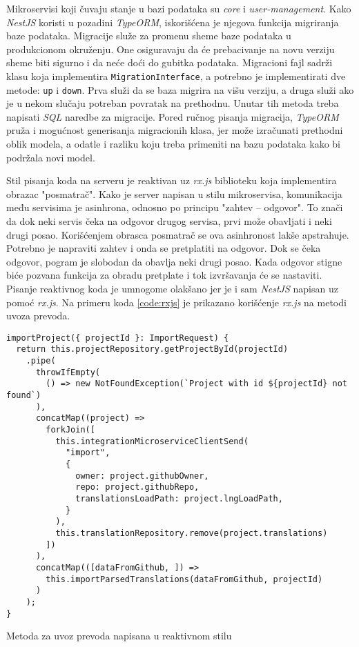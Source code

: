 Mikroservisi koji čuvaju stanje u bazi podataka su \textit{core} i 
\textit{user-management}. Kako \textit{NestJS} koristi u pozadini \textit{TypeORM}, 
iskorišćena je njegova funkcija migriranja baze podataka. Migracije služe 
za promenu sheme baze podataka u produkcionom okruženju. One osiguravaju da 
će prebacivanje na novu verziju sheme biti sigurno i da neće doći do gubitka 
podataka. Migracioni fajl sadrži klasu koja implementira 
\texttt{MigrationInterface}, a potrebno je implementirati dve metode: 
\texttt{up} i \texttt{down}. Prva služi da se baza migrira na višu 
verziju, a druga služi ako je u nekom slučaju potreban povratak na prethodnu. 
Unutar tih metoda treba napisati \textit{SQL} naredbe za migracije. Pored 
ručnog pisanja migracija, \textit{TypeORM} pruža i mogućnost generisanja 
migracionih klasa, jer može izračunati prethodni oblik modela, a odatle i 
razliku koju treba primeniti na bazu podataka kako bi podržala novi model. 

Stil pisanja koda na serveru je reaktivan uz \textit{rx.js} biblioteku koja
implementira obrazac "posmatrač". Kako je server napisan u stilu mikroservisa,
komunikacija među servisima je asinhrona, odnosno po principu 
"zahtev -- odgovor". To znači da dok neki servis čeka na odgovor drugog 
servisa, prvi može obavljati i neki drugi posao. Korišćenjem obrasca 
posmatrač se ova asinhronost lakše apstrahuje. Potrebno je napraviti zahtev 
i onda se pretplatiti na odgovor. Dok se čeka odgovor, pogram je slobodan da 
obavlja neki drugi posao. Kada odgovor stigne biće pozvana funkcija 
za obradu pretplate i tok izvršavanja će se nastaviti.
Pisanje reaktivnog koda je umnogome olakšano jer je i sam \textit{NestJS} 
napisan uz pomoć \textit{rx.js}. Na primeru koda \ref{code:rxjs} je prikazano
korišćenje \textit{rx.js} na metodi uvoza prevoda.


\begin{listing}[h]
  \centering
  \begin{verbatim}
importProject({ projectId }: ImportRequest) {
  return this.projectRepository.getProjectById(projectId)
    .pipe(
      throwIfEmpty(
        () => new NotFoundException(`Project with id ${projectId} not found`)
      ),
      concatMap((project) =>
        forkJoin([
          this.integrationMicroserviceClientSend(
            "import",
            {
              owner: project.githubOwner,
              repo: project.githubRepo,
              translationsLoadPath: project.lngLoadPath,
            }
          ),
          this.translationRepository.remove(project.translations)
        ])
      ),
      concatMap(([dataFromGithub, ]) =>
        this.importParsedTranslations(dataFromGithub, projectId)
      )
    );
}  
  \end{verbatim}
\caption{Metoda za uvoz prevoda napisana u reaktivnom stilu}
\label{code:rxjs}
\end{listing}


